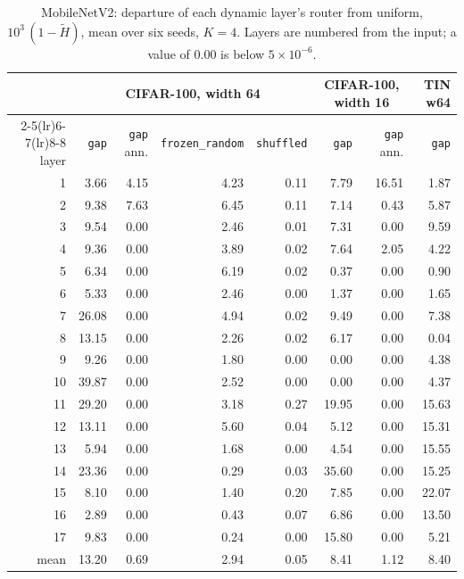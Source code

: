 \documentclass[10pt,a4paper]{article}
\begin{document}
\begin{table}[h]\centering\small
\caption{MobileNetV2: departure of each dynamic layer's router from
uniform, $10^3\,(1-\tilde H)$, mean over six seeds, $K=4$. Layers are
numbered from the input; a value of 0.00 is below $5\times10^{-6}$.}
\label{tab:mblayer}
\begin{tabular}{r rrrr rr r}
\toprule
& \multicolumn{4}{c}{CIFAR-100, width 64} & \multicolumn{2}{c}{CIFAR-100, width 16} & TIN w64 \\
\cmidrule(lr){2-5}\cmidrule(lr){6-7}\cmidrule(lr){8-8}
layer & \texttt{gap} & \texttt{gap} ann. & \texttt{frozen\_random} & \texttt{shuffled} & \texttt{gap} & \texttt{gap} ann. & \texttt{gap} \\
\midrule
1 & 3.66 & 4.15 & 4.23 & 0.11 & 7.79 & 16.51 & 1.87 \\
2 & 9.38 & 7.63 & 6.45 & 0.11 & 7.14 & 0.43 & 5.87 \\
3 & 9.54 & 0.00 & 2.46 & 0.01 & 7.31 & 0.00 & 9.59 \\
4 & 9.36 & 0.00 & 3.89 & 0.02 & 7.64 & 2.05 & 4.22 \\
5 & 6.34 & 0.00 & 6.19 & 0.02 & 0.37 & 0.00 & 0.90 \\
6 & 5.33 & 0.00 & 2.46 & 0.00 & 1.37 & 0.00 & 1.65 \\
7 & 26.08 & 0.00 & 4.94 & 0.02 & 9.49 & 0.00 & 7.38 \\
8 & 13.15 & 0.00 & 2.26 & 0.02 & 6.17 & 0.00 & 0.04 \\
9 & 9.26 & 0.00 & 1.80 & 0.00 & 0.00 & 0.00 & 4.38 \\
10 & 39.87 & 0.00 & 2.52 & 0.00 & 0.00 & 0.00 & 4.37 \\
11 & 29.20 & 0.00 & 3.18 & 0.27 & 19.95 & 0.00 & 15.63 \\
12 & 13.11 & 0.00 & 5.60 & 0.04 & 5.12 & 0.00 & 15.31 \\
13 & 5.94 & 0.00 & 1.68 & 0.00 & 4.54 & 0.00 & 15.55 \\
14 & 23.36 & 0.00 & 0.29 & 0.03 & 35.60 & 0.00 & 15.25 \\
15 & 8.10 & 0.00 & 1.40 & 0.20 & 7.85 & 0.00 & 22.07 \\
16 & 2.89 & 0.00 & 0.43 & 0.07 & 6.86 & 0.00 & 13.50 \\
17 & 9.83 & 0.00 & 0.24 & 0.00 & 15.80 & 0.00 & 5.21 \\
\midrule mean & 13.20 & 0.69 & 2.94 & 0.05 & 8.41 & 1.12 & 8.40 \\
\bottomrule
\end{tabular}
\end{table}
\end{document}

